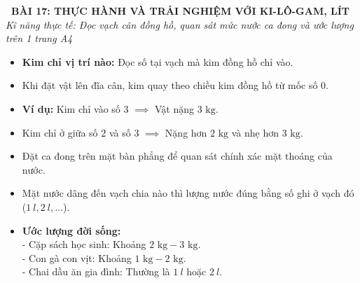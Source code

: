 \documentclass[11pt,a4paper]{article}
\begin{document}
\begin{tcolorbox}[
  enhanced,
  colback=violet!8!white,
  colframe=violet!70!black,
  arc=3mm, boxrule=1.2pt,
  left=3mm, right=3mm, top=2mm, bottom=2mm,
  halign=center
]
  {\LARGE\bfseries\color{violet!90!black}\faBookmark\ BÀI 17: THỰC HÀNH VÀ TRẢI NGHIỆM VỚI KI-LÔ-GAM, LÍT}\\[1mm]
  {\itshape\footnotesize\color{black!75} Kĩ năng thực tế: Đọc vạch cân đồng hồ, quan sát mức nước ca đong và ước lượng trên 1 trang A4}
\end{tcolorbox}

\vspace{-2mm}

\noindent
\begin{minipage}[t]{0.49\textwidth}\vspace{0pt}
\begin{tcolorbox}[
  enhanced,
  colback=violet!4!white,
  colframe=violet!75!black,
  arc=2mm, boxrule=0.8pt,
  left=2mm, right=2mm, top=1.8mm, bottom=1.8mm,
  title={\footnotesize\bfseries\color{white}\faKey\ 1. Kĩ năng đọc cân đồng hồ}
]
{\footnotesize
\begin{itemize}\setlength{\itemsep}{1pt}\setlength{\leftskip}{-2.5mm}
  \item \textbf{Kim chỉ vị trí nào:} Đọc số tại vạch mà kim đồng hồ chỉ vào.
  \item Khi đặt vật lên đĩa cân, kim quay theo chiều kim đồng hồ từ mốc số $0$.
  \item \textbf{Ví dụ:} Kim chỉ vào số $3$ $\implies$ Vật nặng $3\text{ kg}$.
  \item Kim chỉ ở giữa số $2$ và số $3$ $\implies$ Nặng hơn $2\text{ kg}$ và nhẹ hơn $3\text{ kg}$.
\end{itemize}
}
\end{tcolorbox}
\end{minipage}
\hfill
\begin{minipage}[t]{0.49\textwidth}\vspace{0pt}
\begin{tcolorbox}[
  enhanced,
  colback=teal!4!white,
  colframe=teal!75!black,
  arc=2mm, boxrule=0.8pt,
  left=2mm, right=2mm, top=1.8mm, bottom=1.8mm,
  title={\footnotesize\bfseries\color{white}\faSliders\ 2. Kĩ năng đong nước và ước lượng}
]
{\footnotesize
\begin{itemize}\setlength{\itemsep}{1pt}\setlength{\leftskip}{-2.5mm}
  \item Đặt ca đong trên mặt bàn phẳng để quan sát chính xác mặt thoáng của nước.
  \item Mặt nước dâng đến vạch chia nào thì lượng nước đúng bằng số ghi ở vạch đó ($1\ l, 2\ l,\dots$).
  \item \textbf{Ước lượng đời sống:}\\
  - Cặp sách học sinh: Khoảng $2\text{ kg} - 3\text{ kg}$.\\
  - Con gà con vịt: Khoảng $1\text{ kg} - 2\text{ kg}$.\\
  - Chai dầu ăn gia đình: Thường là $1\ l$ hoặc $2\ l$.
\end{itemize}
}
\end{tcolorbox}
\end{minipage}
\end{document}
